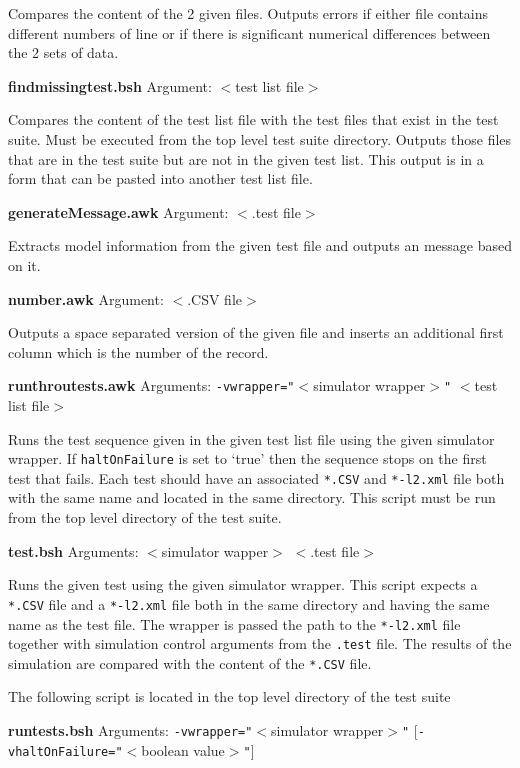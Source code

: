 \documentclass{cekarticle}
\begin{document}
Compares the content of the 2 given files.  Outputs errors if
either file contains different numbers of line or if there is
significant numerical differences between the 2 sets of data.

\textbf{findmissingtest.bsh} Argument: $<$test list file$>$

Compares the content of the test list file with the test files
that exist in the test suite.  Must be executed from the top level
test suite directory.  Outputs those files that are in the test
suite but are not in the given test list.  This output is in a
form that can be pasted into another test list file.

\textbf{generateMessage.awk} Argument: $<$.test file$>$

Extracts model information from the given test file and outputs an
message based on it.

\textbf{number.awk} Argument: $<$.CSV file$>$

Outputs a space separated version of the given file and inserts an
additional first column which is the number of the record.

\textbf{runthroutests.awk} Arguments:
\texttt{-vwrapper="}$<$simulator wrapper$>$\texttt{"} \newline
[\texttt{-vhaltOnFailure="}$<$boolean value$>$\texttt{"}] $<$test
list file$>$

Runs the test sequence given in the given test list file using the
given simulator wrapper.  If \texttt{haltOnFailure} is set to
`true' then the sequence stops on the first test that fails.  Each
test should have an associated \texttt{*.CSV} and
\texttt{*-l2.xml} file both with the same name and located in the
same directory. This script must be run from the top level
directory of the test suite.

\textbf{test.bsh} Arguments: $<$simulator wapper$>$ $<$.test
file$>$

Runs the given test using the given simulator wrapper.  This
script expects a \texttt{*.CSV} file and a \texttt{*-l2.xml} file
both in the same directory and having the same name as the test
file.  The wrapper is passed the path to the \texttt{*-l2.xml}
file together with simulation control arguments from the
\texttt{.test} file.  The results of the simulation are compared
with the content of the \texttt{*.CSV} file.

The following script is located in the top level directory of the
test suite

\textbf{runtests.bsh} Arguments: \texttt{-vwrapper="}$<$simulator
wrapper$>$\texttt{"} [\texttt{-vhaltOnFailure="}$<$boolean
value$>$\texttt{"}]
\end{document}

